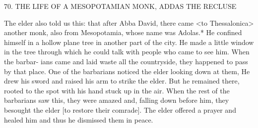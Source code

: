 70. THE LIFE OF A MESOPOTAMIAN MONK,
ADDAS THE RECLUSE

The elder also told us this: that after Abba David, there came <to
Thessalonica> another monk, also from Mesopotamia, whose name
was Adolas.* He confined himself in a hollow plane tree in another
part of the city. He made a little window in the tree through which
he could talk with people who came to see him. When the barbar-
ians came and laid waste all the countryside, they happened to pass
by that place. One of the barbarians noticed the elder looking down
at them, He drew his sword and raised his arm to strike the elder.
But he remained there, rooted to the spot with his hand stuck up in
the air. When the rest of the barbarians saw this, they were amazed
and, falling down before him, they besought the elder [to restore
their comrade]. The elder offered a prayer and healed him and thus
he dismissed them in peace.
